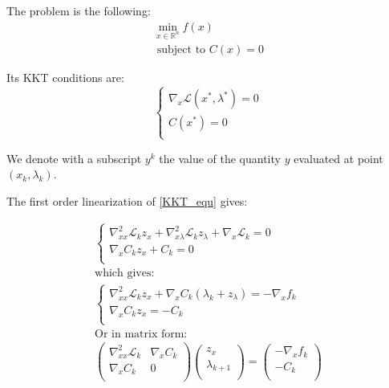 The problem is the following:
\begin{equation}
  \begin{array}{l}
    \min_{x\in\mathbb{R}^n}{f(x)} \\
    \text{ subject to } C(x) = 0
  \end{array}
\end{equation}

Its KKT conditions are:
\begin{equation}
  \label{KKT_equ}
  \left\{
\begin{array}{ll}
  \nabla_x\mathcal{L}(x^*,\lambda^*) = 0\\
  C(x^*) = 0\\
\end{array}
\right.
\end{equation}

We denote with a subscript $y^k$ the value of the quantity $y$ evaluated at point $(x_k, \lambda_k)$.

The first order linearization of \ref{KKT_equ} gives:

\begin{equation}
  \label{KKT_1st_order}
  \begin{array}{l}

  \left\{
\begin{array}{l}
  \nabla_{xx}^2\mathcal{L}_k z_x + \nabla_{x\lambda}^2\mathcal{L}_k z_\lambda + \nabla_x\mathcal{L}_k  = 0\\
  \nabla_x C_k z_x + C_k = 0\\
\end{array}
\right. \\
\text{which gives:}\\
  \left\{
\begin{array}{l}
  \nabla_{xx}^2\mathcal{L}_k z_x + \nabla_{x}C_k (\lambda_k + z_\lambda) = - \nabla_{x}f_k\\
  \nabla_x C_k z_x = - C_k \\
\end{array}
\right. \\
\text{Or in matrix form:}\\
  \begin{pmatrix}
      \nabla_{xx}^2\mathcal{L}_k & \nabla_x C_k\\
      \nabla_x C_k & 0\\
  \end{pmatrix}
  \begin{pmatrix}
      z_x\\
      \lambda_{k+1}\\
  \end{pmatrix}
  =
  \begin{pmatrix}
      - \nabla_{x}f_k\\
      - C_k\\
  \end{pmatrix}
  \end{array}
\end{equation}

